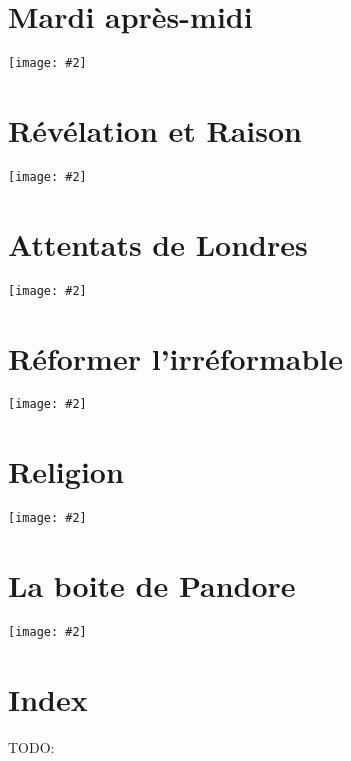 \documentclass[12pt]{memoir}
\newcommand{\img}[3]{\begin{center}%
\texttt{[image: \#2]}\\{\small\em#3}%
\end{center}}
\begin{document}
\chapter{Mardi après-midi}

\img{scale=0.4}{911_Second_Plane.jpg}{}


\chapter{Révélation et Raison}

\img{scale=0.6}{Man_Reading_Koran.jpg}{}


\chapter{Attentats de Londres}

\img{scale=1.2}{London_Bombings.jpg}{}


\chapter{Réformer l’irréformable}

\img{scale=0.4}{Quranic_Script.jpg}{}


\chapter{Religion}

\img{scale=0.6}{Neasden_Temple.jpg}{}


\chapter{La boite de Pandore}

\img{scale=0.5}{Pandoras_Box.jpg}{}


\backmatter

\chapter{Index}
TODO:
\end{document}
